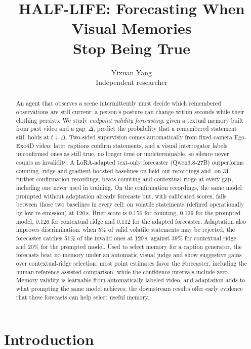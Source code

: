 \documentclass[10pt]{article}
\title{HALF-LIFE: Forecasting When Visual Memories\\Stop Being True}
\author{Yixuan Yang\\Independent researcher}
\begin{document}
\maketitle

\begin{abstract}
An agent that observes a scene intermittently must decide which remembered observations are still current: a person's posture can change within seconds while their clothing persists. We study \emph{endpoint validity forecasting}: given a textual memory built from past video and a gap~$\Delta$, predict the probability that a remembered statement still holds at $t+\Delta$. Two-sided supervision comes automatically from fixed-camera Ego-Exo4D video: later captions confirm statements, and a visual interrogator labels unconfirmed ones as still true, no longer true or undeterminable, so silence never counts as invalidity. A LoRA-adapted text-only forecaster (Qwen3.8-27B) outperforms counting, ridge and gradient-boosted baselines on held-out recordings and, on 31 further confirmation recordings, beats counting and contextual ridge at every gap, including one never used in training. On the confirmation recordings, the same model prompted without adaptation already forecasts but, with calibrated scores, falls between those two baselines in every cell: on volatile statements (defined operationally by low re-emission) at 120\,s, Brier score is 0.156 for counting, 0.139 for the prompted model, 0.126 for contextual ridge and 0.112 for the adapted forecaster. Adaptation also improves discrimination: when 5\% of valid volatile statements may be rejected, the forecaster catches 51\% of the invalid ones at 120\,s, against 39\% for contextual ridge and 20\% for the prompted model. Used to select memory for a caption generator, the forecasts beat no memory under an automatic visual judge and show suggestive gains over contextual-ridge selection: most point estimates favor the Forecaster, including the human-reference-assisted comparison, while the confidence intervals include zero. Memory validity is learnable from automatically labeled video, and adaptation adds to what prompting the same model achieves; the downstream results offer early evidence that these forecasts can help select useful memory.
\end{abstract}

\section{Introduction}
\label{sec:intro}
\end{document}
